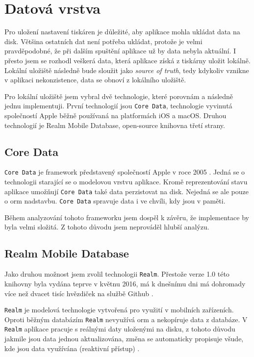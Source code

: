 \section{Datová vrstva}\label{analyza-datova-vrstva}

Pro uložení nastavení tiskáren je důležité, aby aplikace mohla ukládat data na disk.
Většina ostatních dat není potřeba ukládat, protože je velmi pravděpodobné, že při dalším spuštění aplikace už by data nebyla aktuální.
I přesto jsem se rozhodl veškerá data, která aplikace získá z tiskárny uložit lokálně.
Lokální uložiště následně bude sloužit jako \textit{source of truth}, tedy kdykoliv vznikne v aplikaci nekonzistence, data se obnoví z lokálního uložiště.

Pro lokální uložiště jsem vybral dvě technologie, které porovnám a následně jednu implementuji.
První technologií jsou \texttt{Core Data}, technologie vyvinutá společností Apple běžně používaná na platformách iOS a macOS.
Druhou technologií je Realm Mobile Database, open-source knihovna třetí strany.

\subsection{Core Data}

\texttt{Core Data} je framework představený společností Apple v roce 2005 \cite{objcio-core-data}.
Jedná se o technologii starající se o modelovou vrstvu aplikace.
Kromě reprezentování stavu aplikace umožňují \texttt{Core Data} také data perzistovat na disk.
Nejedná se ale pouze o \acrfull{orm} nadstavbu.
\texttt{Core Data} spravuje data i ve chvíli, kdy jsou v paměti.

Během analyzování tohoto frameworku jsem dospěl k závěru, že implementace by byla velmi složitá.
Z tohoto důvodu jsem neprováděl hlubší analýzu.

\subsection{Realm Mobile Database}\label{datova-vrstva-realm}

Jako druhou možnost jsem zvolil technologii \texttt{Realm}.
Přestože verze 1.0 této knihovny byla vydána teprve v květnu 2016, má k dnešnímu dni má dohromady více než dvacet tisíc hvězdiček na službě Github \cite{github-realm-repos}.

\texttt{Realm} je modelová technologie vytvořená pro využití v mobilních zařízeních.
Oproti běžným databázím \texttt{Realm} nevyužívá \acrshort{orm} a nekopíruje data z databáze.
V \texttt{Realm} aplikace pracuje s reálnými daty uloženými na disku, z tohoto důvodu jakmile jsou data jednou aktualizována, změna se automaticky propisuje všude, kde jsou data využívána (reaktivní přístup) \cite{realm-overview}.

